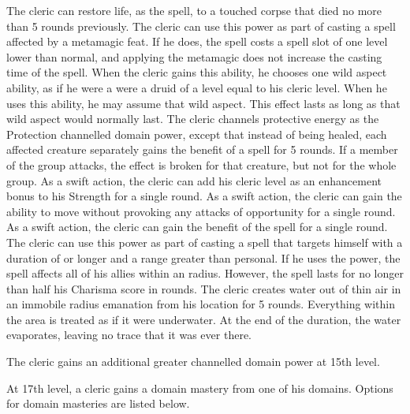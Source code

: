  The cleric can restore life, as the  spell, to a touched corpse that died no more than 5 rounds previously.
 The cleric can use this power as part of casting a spell affected by a metamagic feat. If he does, the spell costs a spell slot of one level lower than normal, and applying the metamagic does not increase the casting time of the spell.
 When the cleric gains this ability, he chooses one wild aspect ability, as if he were a were a druid of a level equal to his cleric level. When he uses this ability, he may assume that wild aspect. This effect lasts as long as that wild aspect would normally last.
 The cleric channels protective energy as the Protection channelled domain power, except that instead of being healed, each affected creature separately gains the benefit of a  spell for 5 rounds.  If a member of the group attacks, the effect is broken for that creature, but not for the whole group.
 As a swift action, the cleric can add his cleric level as an enhancement bonus to his Strength for a single round.
 As a swift action, the cleric can gain the ability to move without provoking any attacks of opportunity for a single round.
 As a swift action, the cleric can gain the benefit of the  spell for a single round.
 The cleric can use this power as part of casting a spell that targets himself with a duration of \durshort or longer and a range greater than personal. If he uses the power, the spell affects all of his allies within an \areamed radius. However, the spell lasts for no longer than half his Charisma score in rounds.
 The cleric creates water out of thin air in an immobile \areamed radius emanation from his location for 5 rounds. Everything within the area is treated as if it were underwater. At the end of the duration, the water evaporates, leaving no trace that it was ever there.

\par The cleric gains an additional greater channelled domain power at 15th level.

 At 17th level, a cleric gains a domain mastery from one of his domains. Options for domain masteries are listed below.

